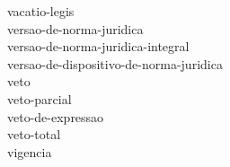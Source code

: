 \Gls{vacatio-legis} \\ 
\Gls{versao-de-norma-juridica} \\ 
 \hspace*{1.0cm}\glosshsep \Gls{versao-de-norma-juridica-integral} \\ 
 \hspace*{1.0cm}\glosshsep \Gls{versao-de-dispositivo-de-norma-juridica} \\ 
\Gls{veto} \\ 
 \hspace*{1.0cm}\glosshsep \Gls{veto-parcial} \\ 
 \hspace*{2.0cm}\glosshsep \Gls{veto-de-expressao} \\ 
 \hspace*{1.0cm}\glosshsep \Gls{veto-total} \\ 
\Gls{vigencia} \\ 
